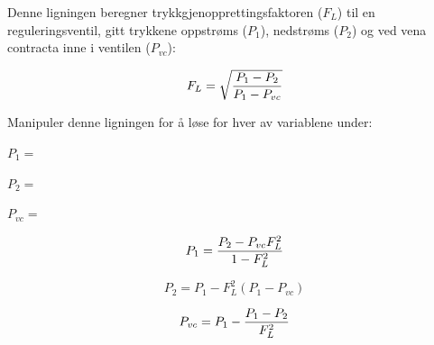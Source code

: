 

Denne ligningen beregner trykkgjenopprettingsfaktoren ($F_L$) til en reguleringsventil, gitt trykkene oppstrøms ($P_1$), nedstrøms ($P_2$) og ved vena contracta inne i ventilen ($P_{vc}$):

$$F_L = \sqrt{{P_1 - P_2} \over {P_1 - P_{vc}}}$$

Manipuler denne ligningen for å løse for hver av variablene under:

\vskip 10pt

$P_1 =$

\vskip 10pt

$P_2 =$

\vskip 10pt

$P_{vc} =$

\vskip 10pt







$$P_1 = {P_2 - P_{vc}F_L^2 \over 1 - F_L^2}$$

\vskip 20pt

$$P_2 = P_1 - F_L^2 (P_1 - P_{vc})$$

\vskip 20pt

$$P_{vc} = P_1 - {P_1 - P_2 \over F_L^2}$$










